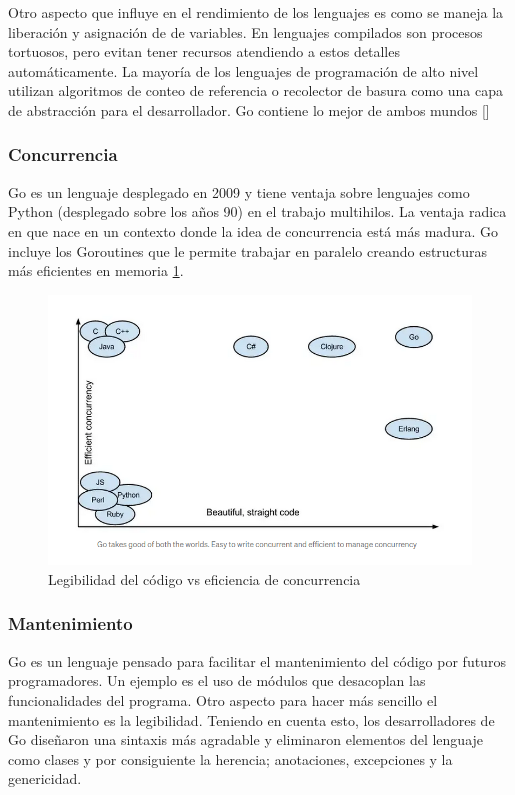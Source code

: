 Otro aspecto que influye en el rendimiento de los lenguajes es como se maneja la liberación y asignación de de variables. En lenguajes compilados son procesos tortuosos, pero evitan tener recursos atendiendo a estos detalles automáticamente. La mayoría de los lenguajes de programación de alto nivel utilizan algoritmos de conteo de referencia o recolector de basura como una capa de abstracción para el desarrollador. Go contiene lo mejor de ambos mundos [\cite{whygo}]


\subsubsection{Concurrencia}
Go es un lenguaje desplegado en 2009 y tiene ventaja sobre lenguajes como Python (desplegado sobre los años 90) en el trabajo multihilos. La ventaja radica en que nace en un contexto donde la idea de concurrencia está más madura. Go incluye los Goroutines que le permite trabajar en paralelo creando estructuras más eficientes en memoria \ref{fig:7}. 

\begin{figure}[h]
	\includegraphics[width=\linewidth]{Graphics/go_concurr.png}
	\caption{Legibilidad del código vs eficiencia de concurrencia}
	\label{fig:7}
\end{figure} 

\subsubsection{Mantenimiento}
Go es un lenguaje pensado para facilitar el mantenimiento del código por futuros programadores. Un ejemplo es el uso de módulos que desacoplan las funcionalidades del programa. Otro aspecto para hacer más sencillo el mantenimiento es la legibilidad. Teniendo en cuenta esto, los desarrolladores de Go diseñaron una sintaxis más agradable y eliminaron elementos del lenguaje como clases y por consiguiente la herencia; anotaciones, excepciones y la genericidad.

